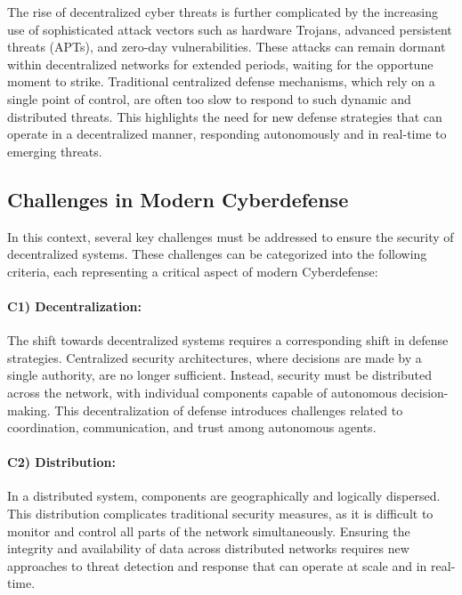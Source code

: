 The rise of decentralized cyber threats is further complicated by the increasing use of sophisticated attack vectors such as hardware Trojans, advanced persistent threats (APTs), and zero-day vulnerabilities\cite{chen2014study}. These attacks can remain dormant within decentralized networks for extended periods, waiting for the opportune moment to strike. Traditional centralized defense mechanisms, which rely on a single point of control, are often too slow to respond to such dynamic and distributed threats\cite{vasilomanolakis2015taxonomy}. This highlights the need for new defense strategies that can operate in a decentralized manner, responding autonomously and in real-time to emerging threats\cite{vasilomanolakis2015taxonomy}.

\subsection{Challenges in Modern Cyberdefense}

In this context, several key challenges must be addressed to ensure the security of decentralized systems. These challenges can be categorized into the following criteria, each representing a critical aspect of modern Cyberdefense:

\paragraph{C1) Decentralization:}
The shift towards decentralized systems requires a corresponding shift in defense strategies. Centralized security architectures, where decisions are made by a single authority, are no longer sufficient. Instead, security must be distributed across the network, with individual components capable of autonomous decision-making\cite{xu2021decentralized}. This decentralization of defense introduces challenges related to coordination, communication, and trust among autonomous agents\cite{tosh2018evolutionary}.

\paragraph{C2) Distribution:}
In a distributed system, components are geographically and logically dispersed. This distribution complicates traditional security measures, as it is difficult to monitor and control all parts of the network simultaneously\cite{vasilomanolakis2015taxonomy}. Ensuring the integrity and availability of data across distributed networks requires new approaches to threat detection and response that can operate at scale and in real-time\cite{husak2019survey}.

